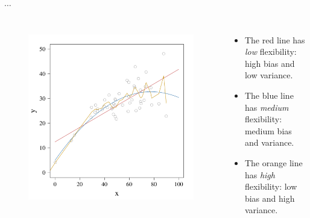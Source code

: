 \documentclass[8pt]{beamer}
\begin{document}
\begin{frame}{$\ldots$}

\begin{columns}

\begin{figure}
    \centering
    \includegraphics[width=1\textwidth]{model_flex.pdf}
    \label{model_flex}
\end{figure} %

\begin{itemize}
    \item The \textcolor{IndianRed3}{red} line has \textit{low} flexibility: high bias and low variance. 
    \item The \textcolor{SteelBlue4}{blue} line has \textit{medium} flexibility: medium bias and variance. 
    \item The \textcolor{Goldenrod3}{orange} line has \textit{high} flexibility: low bias and high variance. 
\end{itemize}

\end{columns}
    
\end{frame}
\end{document}
